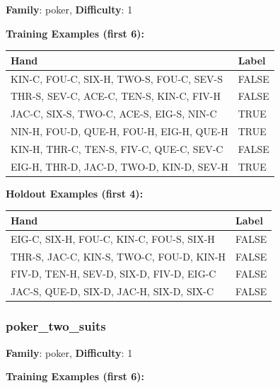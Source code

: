 \documentclass[10pt,a4paper]{article}
\begin{document}
\textbf{Family}: poker, \textbf{Difficulty}: 1

\textbf{Training Examples (first 6):}

\begin{small}
\begin{tabular}{p{8cm}l}
\toprule
Hand & Label \\
\midrule
KIN-C, FOU-C, SIX-H, TWO-S, FOU-C, SEV-S & \textcolor{negative}{FALSE} \\
THR-S, SEV-C, ACE-C, TEN-S, KIN-C, FIV-H & \textcolor{negative}{FALSE} \\
JAC-C, SIX-S, TWO-C, ACE-S, EIG-S, NIN-C & \textcolor{positive}{TRUE} \\
NIN-H, FOU-D, QUE-H, FOU-H, EIG-H, QUE-H & \textcolor{positive}{TRUE} \\
KIN-H, THR-C, TEN-S, FIV-C, QUE-C, SEV-C & \textcolor{negative}{FALSE} \\
EIG-H, THR-D, JAC-D, TWO-D, KIN-D, SEV-H & \textcolor{positive}{TRUE} \\
\bottomrule
\end{tabular}
\end{small}

\textbf{Holdout Examples (first 4):}

\begin{small}
\begin{tabular}{p{8cm}l}
\toprule
Hand & Label \\
\midrule
EIG-C, SIX-H, FOU-C, KIN-C, FOU-S, SIX-H & \textcolor{negative}{FALSE} \\
THR-S, JAC-C, KIN-S, TWO-C, FOU-D, KIN-H & \textcolor{negative}{FALSE} \\
FIV-D, TEN-H, SEV-D, SIX-D, FIV-D, EIG-C & \textcolor{negative}{FALSE} \\
JAC-S, QUE-D, SIX-D, JAC-H, SIX-D, SIX-C & \textcolor{negative}{FALSE} \\
\bottomrule
\end{tabular}
\end{small}

\vspace{0.5cm}

\subsubsection{poker\_two\_suits}

\textbf{Family}: poker, \textbf{Difficulty}: 1

\textbf{Training Examples (first 6):}
\end{document}

